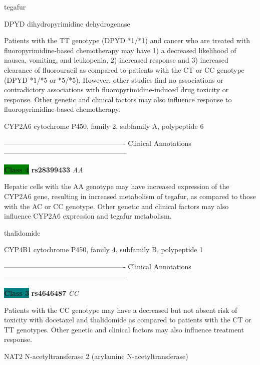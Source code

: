 \documentclass{resume} %
\begin{document}
\begin{rSection}{ tegafur }
\begin{rSubsection}{ DPYD }{ dihydropyrimidine dehydrogenase }{}{}
\item[] Patients with the TT genotype (DPYD *1/*1) and cancer who are treated with fluoropyrimidine-based chemotherapy may have 1) a decreased likelihood of nausea, vomiting, and leukopenia, 2) increased response and 3) increased clearance of fluorouracil as compared to patients with the CT or CC genotype (DPYD *1/*5 or *5/*5). However, other studies find no associations or contradictory associations with fluoropyrimidine-induced drug toxicity or response. Other genetic and clinical factors may also influence response to fluoropyrimidine-based chemotherapy.
\end{rSubsection}\begin{rSubsection}{ CYP2A6 }{ cytochrome P450, family 2, subfamily A, polypeptide 6 }{}{}
\item[]

\item[] ---------------------------------------------------- Clinical Annotations -----------------------------------------------------\newline
\item \textbf{\colorbox{green} {Class 4}} \textbf{ rs28399433 } \textit{ AA }
\item[] Hepatic cells with the AA genotype may have increased expression of the CYP2A6 gene, resulting in increased metabolism of tegafur, as compared to those with the AC or CC genotype. Other genetic and clinical factors may also influence CYP2A6 expression and tegafur metabolism.
\end{rSubsection}

\end{rSection}\begin{rSection}{ thalidomide }
\item[]

\begin{rSubsection}{ CYP4B1 }{ cytochrome P450, family 4, subfamily B, polypeptide 1 }{}{}
\item[]

\item[] ---------------------------------------------------- Clinical Annotations -----------------------------------------------------\newline
\item \textbf{\colorbox{teal} {Class 3}} \textbf{ rs4646487 } \textit{ CC }
\item[] Patients with the CC genotype may have a decreased but not absent risk of toxicity with docetaxel and thalidomide as compared to patients with the CT or TT genotypes. Other genetic and clinical factors may also influence treatment response.
\end{rSubsection}\begin{rSubsection}{ NAT2 }{ N-acetyltransferase 2 (arylamine N-acetyltransferase) }{}{}
\item[]


\end{rSubsection}
\end{rSection}
\end{document}
